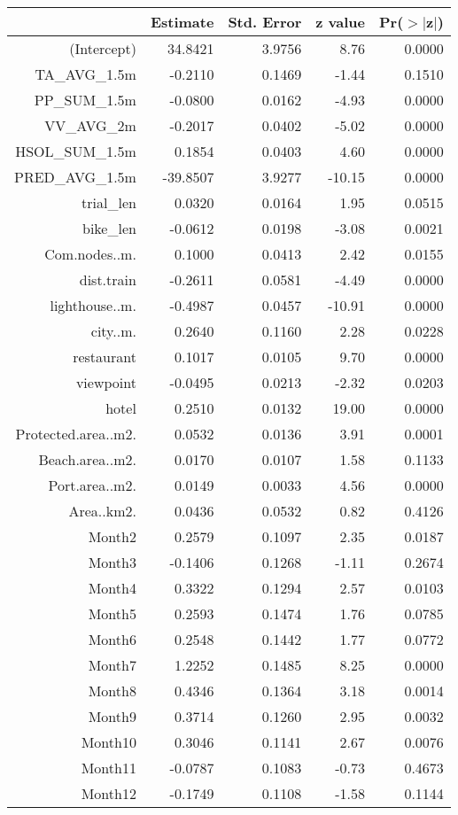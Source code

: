 \begin{table}[ht]
\centering
\begin{tabular}{rrrrr}
  \hline
 & Estimate & Std. Error & z value & Pr($>$$|$z$|$) \\ 
  \hline
(Intercept) & 34.8421 & 3.9756 & 8.76 & 0.0000 \\ 
  TA\_AVG\_1.5m & -0.2110 & 0.1469 & -1.44 & 0.1510 \\ 
  PP\_SUM\_1.5m & -0.0800 & 0.0162 & -4.93 & 0.0000 \\ 
  VV\_AVG\_2m & -0.2017 & 0.0402 & -5.02 & 0.0000 \\ 
  HSOL\_SUM\_1.5m & 0.1854 & 0.0403 & 4.60 & 0.0000 \\ 
  PRED\_AVG\_1.5m & -39.8507 & 3.9277 & -10.15 & 0.0000 \\ 
  trial\_len & 0.0320 & 0.0164 & 1.95 & 0.0515 \\ 
  bike\_len & -0.0612 & 0.0198 & -3.08 & 0.0021 \\ 
  Com.nodes..m. & 0.1000 & 0.0413 & 2.42 & 0.0155 \\ 
  dist.train & -0.2611 & 0.0581 & -4.49 & 0.0000 \\ 
  lighthouse..m. & -0.4987 & 0.0457 & -10.91 & 0.0000 \\ 
  city..m. & 0.2640 & 0.1160 & 2.28 & 0.0228 \\ 
  restaurant & 0.1017 & 0.0105 & 9.70 & 0.0000 \\ 
  viewpoint & -0.0495 & 0.0213 & -2.32 & 0.0203 \\ 
  hotel & 0.2510 & 0.0132 & 19.00 & 0.0000 \\ 
  Protected.area..m2. & 0.0532 & 0.0136 & 3.91 & 0.0001 \\ 
  Beach.area..m2. & 0.0170 & 0.0107 & 1.58 & 0.1133 \\ 
  Port.area..m2. & 0.0149 & 0.0033 & 4.56 & 0.0000 \\ 
  Area..km2. & 0.0436 & 0.0532 & 0.82 & 0.4126 \\ 
  Month2 & 0.2579 & 0.1097 & 2.35 & 0.0187 \\ 
  Month3 & -0.1406 & 0.1268 & -1.11 & 0.2674 \\ 
  Month4 & 0.3322 & 0.1294 & 2.57 & 0.0103 \\ 
  Month5 & 0.2593 & 0.1474 & 1.76 & 0.0785 \\ 
  Month6 & 0.2548 & 0.1442 & 1.77 & 0.0772 \\ 
  Month7 & 1.2252 & 0.1485 & 8.25 & 0.0000 \\ 
  Month8 & 0.4346 & 0.1364 & 3.18 & 0.0014 \\ 
  Month9 & 0.3714 & 0.1260 & 2.95 & 0.0032 \\ 
  Month10 & 0.3046 & 0.1141 & 2.67 & 0.0076 \\ 
  Month11 & -0.0787 & 0.1083 & -0.73 & 0.4673 \\ 
  Month12 & -0.1749 & 0.1108 & -1.58 & 0.1144 \\ 
   \hline
\end{tabular}
\end{table}
